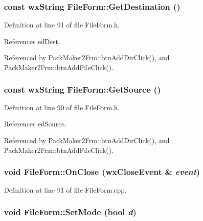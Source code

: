 \subsubsection{\setlength{\rightskip}{0pt plus 5cm}const wx\-String File\-Form::Get\-Destination ()\hspace{0.3cm}{\tt  [inline]}}\label{class_file_form_ddfa3eb84291784ed8e50557d0ff22b7}




Definition at line 91 of file File\-Form.h.

References ed\-Dest.

Referenced by Pack\-Maker2Frm::btn\-Add\-Dir\-Click(), and Pack\-Maker2Frm::btn\-Add\-File\-Click().
\subsubsection{\setlength{\rightskip}{0pt plus 5cm}const wx\-String File\-Form::Get\-Source ()\hspace{0.3cm}{\tt  [inline]}}\label{class_file_form_1a642f639c668a45618332e32cc4bb63}




Definition at line 90 of file File\-Form.h.

References ed\-Source.

Referenced by Pack\-Maker2Frm::btn\-Add\-Dir\-Click(), and Pack\-Maker2Frm::btn\-Add\-File\-Click().
\subsubsection{\setlength{\rightskip}{0pt plus 5cm}void File\-Form::On\-Close (wx\-Close\-Event \& {\em event})\hspace{0.3cm}{\tt  [private]}}\label{class_file_form_25f3eaa8be4ec6f01112aac7e1e9ef45}




Definition at line 91 of file File\-Form.cpp.
\subsubsection{\setlength{\rightskip}{0pt plus 5cm}void File\-Form::Set\-Mode (bool {\em d})}\label{class_file_form_e38d3978a0cee7208f5cbc0de12d92ff}




